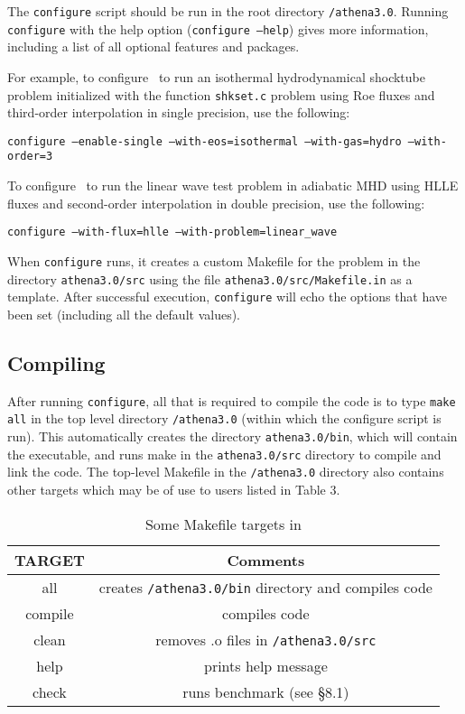 The {\tt configure} script
should be run in the root directory {\tt /athena3.0}.  Running {\tt configure}
with the help option ({\tt configure --help}) gives more information,
including a list of all optional features and packages.

For example, to configure \ath\ to run an isothermal hydrodynamical shocktube
problem initialized with the function {\tt shkset.c} problem
using Roe fluxes and third-order interpolation in single precision, use the
following:
\begin{center}
{\tt configure --enable-single --with-eos=isothermal --with-gas=hydro --with-order=3}
\end{center}

To configure \ath\ to run the linear wave test problem in adiabatic MHD
using HLLE fluxes and second-order interpolation in double precision,
use the following:
\begin{center}
{\tt configure --with-flux=hlle --with-problem=linear\_wave}
\end{center}

When {\tt configure} runs, it creates a custom Makefile for the problem in
the directory {\tt athena3.0/src} using the file {\tt athena3.0/src/Makefile.in} as a
template.  After successful execution,
{\tt configure} will echo the options that have been set (including all the
default values).

\subsection{Compiling \ath}

After running {\tt configure}, all that is required to compile the code
is to type {\tt make all} in the top level directory {\tt /athena3.0}
(within which the configure script is run).  This automatically creates
the directory {\tt athena3.0/bin}, which will contain the executable, and runs make
in the {\tt athena3.0/src} directory to compile and link the code.  The top-level
Makefile in the {\tt /athena3.0} directory also contains other targets
which may be of use to users listed in Table 3.

\begin{table}[ht]
\caption{Some Makefile targets in \ath}
\begin{tabular}{|c|c|} \hline \hline
TARGET & Comments \\ \hline
all & creates {\tt /athena3.0/bin} directory and compiles code \\
compile & compiles code \\
clean & removes .o files in {\tt /athena3.0/src} \\
help & prints help message \\
check & runs benchmark (see \S 8.1) \\
\hline
\end{tabular}
\end{table}

